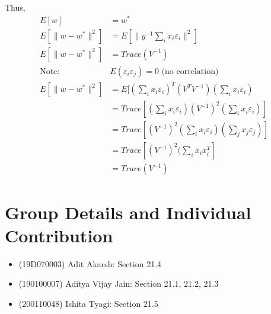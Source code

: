 \documentclass[11pt, twosides]{article}
\begin{document}
Thus, 
\begin{align*}
    E[w] &= w^*\\
    E[\|w-w^*\|^2] &= E[\|y^{-1}\sum_i x_i \varepsilon_i\|^2]\\
    E[\|w-w^*\|^2] &=Trace(V^{-1})\\
    \mbox{Note: }& E(\varepsilon_i \varepsilon_j) = 0 \mbox{ (no correlation)}\\
     E[\|w-w^*\|^2] &=E[(\sum_i x_i \varepsilon_i)^T (V^T V^{-1})(\sum_i x_i \varepsilon_i)\\
     &= Trace[(\sum_i x_i \varepsilon_i) (V^{-1})^2 (\sum_i x_i \varepsilon_i)]\\
     &= Trace[ (V^{-1})^2(\sum_i x_i \varepsilon_i) (\sum_j x_j \varepsilon_j)]\\
     &= Trace[ (V^{-1})^2(\sum_i x_ix_i^T]\\
     &= Trace(V^{-1})
\end{align*}






\section{Group Details and Individual Contribution}
\begin{itemize}
    \item (19D070003) Adit Akarsh: Section 21.4
    \item (190100007) Aditya Vijay Jain:  Section 21.1, 21.2, 21.3
    \item (200110048) Ishita Tyagi: Section 21.5
\end{itemize}
\end{document}
